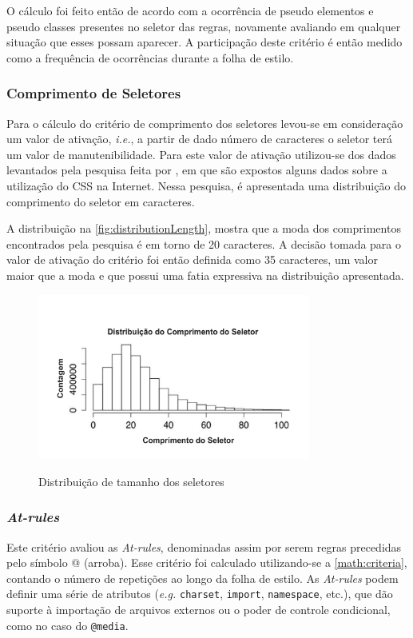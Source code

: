 O cálculo foi feito então de acordo com a ocorrência de pseudo elementos e pseudo classes presentes no seletor das regras, novamente avaliando em qualquer situação que esses possam aparecer. A participação deste critério é então medido como a frequência de ocorrências durante a folha de estilo.

\subsubsection{Comprimento de Seletores}
Para o cálculo do critério de comprimento dos seletores levou-se em consideração um valor de ativação, \textit{i.e.}, a partir de dado número de caracteres o seletor terá um valor de manutenibilidade. Para este valor de ativação utilizou-se dos dados levantados pela pesquisa feita por , em que são expostos alguns dados sobre a utilização do CSS na Internet. Nessa pesquisa, é apresentada uma distribuição do comprimento do seletor em caracteres. 

A distribuição na \autoref{fig:distributionLength}, mostra que a moda dos comprimentos encontrados pela pesquisa é em torno de 20 caracteres. A decisão tomada para o valor de ativação do critério foi então definida como 35 caracteres, um valor maior que a moda e que possui uma fatia expressiva na distribuição apresentada.


\begin{figure}[!htb]
	\centering
	\caption{Distribuição de tamanho dos seletores}
	\includegraphics[width=0.8\textwidth]{./04-figuras/dist_selectorL}
	\label{fig:distributionLength}
\end{figure}

\subsubsection{\textit{At-rules}}
Este critério avaliou as \textit{At-rules}, denominadas assim por serem regras precedidas pelo símbolo @ (arroba). Esse critério foi calculado utilizando-se a \autoref{math:criteria}, contando o número de repetições ao longo da folha de estilo. As \textit{At-rules} podem definir uma série de atributos (\textit{e.g.} \texttt{charset}, \texttt{import}, \texttt{namespace}, etc.), que dão suporte à importação de arquivos externos ou o poder de controle condicional, como no caso do \texttt{@media}.


